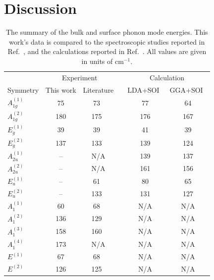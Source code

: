 \documentclass[reprint,aps,pra,superscriptaddress,amsmath,amssymb,linenumbers,longbibliography]{revtex4-1}
\begin{document}
\section{Discussion}\label{sec:Discussion}
\begin{table}[th]
	\caption{\label{table:mode}
		The summary of the bulk and surface phonon mode energies. 
		This work’s data is compared to the spectroscopic studies reported in Ref.~\cite{Gnezdilov2011,LaForge2010,Sobota2014,Kogar2015,Zhang2011,Kim2012,Eddrief2014,Humlicek2014,Irfan2014,Yan2015,Zhang2016,Zhao2011}, and the calculations reported in Ref.~\cite{Chen2011,Wang2012}. 
		All values are given in units of cm$^{-1}$.}
	\vspace{5pt}
	\setlength{\tabcolsep}{8pt}
	\setlength{\extrarowheight}{3pt}
	\begin{tabular}{l c c c c c}
		\hline\hline
		{} & \multicolumn{2}{c}{Experiment} & {    } & \multicolumn{2}{c}{Calculation} \\
		\cline{2-3} \cline{5-6}
		Symmetry & \multicolumn{1}{c}{This work} & \multicolumn{1}{c}{Literature} & & \multicolumn{1}{c}{LDA+SOI~\cite{Wang2012}} & \multicolumn{1}{c}{GGA+SOI~\cite{Chen2011}} \\
		\hline 
		$A_{1g}^{(1)}$ & 75 & 73~\cite{Gnezdilov2011,Zhang2011,Irfan2014,Zhang2016} &  & 77 & 64 \\		
		$A_{1g}^{(2)}$ & 180 & 175~\cite{Gnezdilov2011,Zhang2011,Irfan2014,Zhang2016} &  & 176 & 167 \\
		$E_{g}^{(1)}$ & 39 & 39~\cite{Gnezdilov2011,Zhang2011,Irfan2014,Zhang2016} &  & 41 & 39 \\
		$E_{g}^{(2)}$ & 137 & 133~\cite{Gnezdilov2011,Zhang2011,Irfan2014,Zhang2016} &  & 139 & 124 \\
		$A_{2u}^{(1)}$ & -- & N/A &  & 139 & 137 \\
		$A_{2u}^{(2)}$ & -- & N/A &  & 161 & 156 \\
		$E_{u}^{(1)}$ & -- & 61~\cite{LaForge2010} &  & 80 & 65 \\
		$E_{u}^{(2)}$ & -- & 133~\cite{LaForge2010} &  & 131 & 127 \\
		\hline
		$A_{1}^{(1)}$ & 60 & 68~\cite{Sobota2014} &  & N/A & N/A \\
		$A_{1}^{(2)}$ & 136 & 129~\cite{Gnezdilov2011} &  & N/A & N/A \\
		$A_{1}^{(3)}$ & 158 & 160~\cite{Gnezdilov2011,Kogar2015} &  & N/A & N/A \\
		$A_{1}^{(4)}$ & 173 & N/A &  & N/A & N/A \\
		$E^{(1)}$ & 67 & 68~\cite{Gnezdilov2011} &  & N/A & N/A \\
		$E^{(2)}$ & 126 & 125~\cite{Gnezdilov2011} &  & N/A & N/A \\
		\hline\hline
	\end{tabular}
\end{table}
\end{document}
